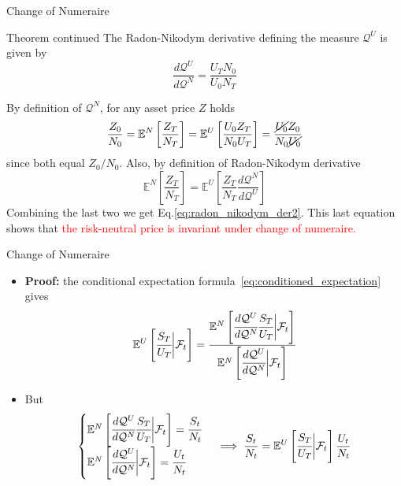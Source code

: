 \documentclass{beamer}
\begin{document}
\begin{frame}{Change of Numeraire}
	\begin{block}{Theorem continued}
		The Radon-Nikodym derivative defining the measure $\mathcal{Q}^U$ is given by
		\begin{equation}
			\frac{d\mathcal{Q}^U}{d\mathcal{Q}^N} = \frac{U_T N_0}{U_0 N_T}
			\label{eq:radon_nikodym_der2}
		\end{equation}
	\end{block}	
	By definition of $\mathcal{Q}^N$, for any asset price $Z$ holds
	\begin{equation*}
		\frac{Z_0}{N_0} = 
		\mathbb{E}^N\left[\frac{Z_T}{N_T}\right] = \mathbb{E}^U\left[\frac{U_0 Z_T}{N_0 U_T}\right] =
		\frac{\cancel{U_0} Z_0}{N_0 \cancel{U_0}}
	\end{equation*}
	since both equal $Z_0/N_0$. Also, by definition of Radon-Nikodym derivative
	\begin{equation*}
		\mathbb{E}^N\left[\frac{Z_T}{N_T}\right] = \mathbb{E}^U\left[\frac{Z_T}{N_T} \frac{d\mathcal{Q}^N}{d\mathcal{Q}^U}\right]
	\end{equation*}
	Combining the last two we get Eq.\ref{eq:radon_nikodym_der2}. This last equation shows that \textcolor{red}{the risk-neutral price is invariant under change of numeraire.}
\end{frame}

\begin{frame}{Change of Numeraire}
	\begin{itemize}
	\item \textbf{Proof:} the conditional expectation formula~\ref{eq:conditioned_expectation} gives
	\begin{equation*}
		\mathbb{E}^U\left[\cfrac{S_T}{U_T}\bigg|\mathcal{F}_t\right]=\cfrac{\mathbb{E}^N\left[\cfrac{d\mathcal{Q}^U}{d\mathcal{Q}^N}\cfrac{S_T}{U_T}\bigg|\mathcal{F}_t\right]}{\mathbb{E}^N\left[\cfrac{d\mathcal{Q}^U}{d\mathcal{Q}^N}\bigg|\mathcal{F}_t\right]}
	\end{equation*}
	\item But 
	\begin{equation*}
		\begin{cases}
		\mathbb{E}^N\left[\cfrac{d\mathcal{Q}^U}{d\mathcal{Q}^N}\cfrac{S_T}{U_T}\bigg|\mathcal{F}_t\right]=\cfrac{S_t}{N_t} \\
		\mathbb{E}^N\left[\cfrac{d\mathcal{Q}^U}{d\mathcal{Q}^N}\bigg|\mathcal{F}_t\right]=\cfrac{U_t}{N_t}
		\end{cases}\implies
		\frac{S_t}{N_t}=\mathbb{E}^U\left[\cfrac{S_T}{U_T}\bigg|\mathcal{F}_t\right]\frac{U_t}{N_t}
	\end{equation*}
    \end{itemize}
\end{frame}	
\end{document}
